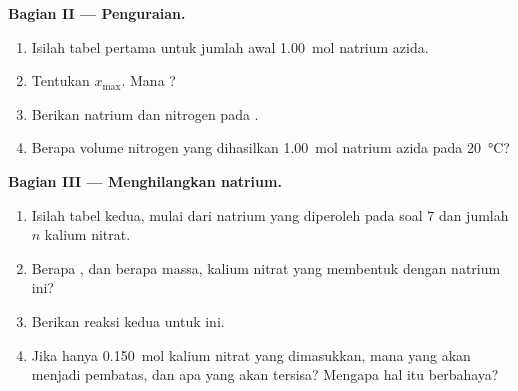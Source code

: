 \begin{problem}
\medskip
\noindent\textbf{Bagian II --- Penguraian.}
\begin{enumerate}[resume]
  \item Isilah tabel  pertama untuk jumlah awal
        \qty{1.00}{mol} natrium azida.
  \item Tentukan $x_{\max}$. Mana ?
  \item Berikan  natrium dan nitrogen pada .
  \item Berapa volume nitrogen yang dihasilkan \qty{1.00}{mol} natrium
        azida pada \qty{20}{\celsius}?
\end{enumerate}

\medskip
\noindent\textbf{Bagian III --- Menghilangkan natrium.}
\begin{enumerate}[resume]
  \item Isilah tabel  kedua, mulai dari natrium yang
        diperoleh pada soal 7 dan jumlah $n$ kalium nitrat.
  \item Berapa , dan berapa massa, kalium nitrat yang membentuk
         dengan natrium ini?
  \item Berikan  reaksi kedua untuk  ini.
  \item Jika hanya \qty{0.150}{mol} kalium nitrat yang dimasukkan,
         mana yang akan menjadi pembatas, dan apa yang akan
        tersisa? Mengapa hal itu berbahaya?
\end{enumerate}


\end{problem}

